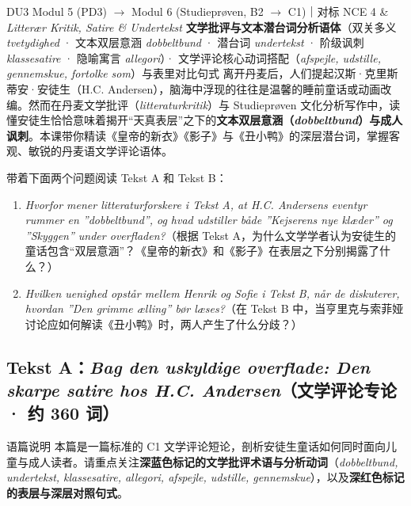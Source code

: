 {DU3 Modul 5 (PD3) $\rightarrow$ Modul 6 (Studieprøven, B2 $\rightarrow$ C1)｜对标 NCE 4 \& \textit{Litterær Kritik, Satire \& Undertekst}}
{\textbf{文学批评与文本潜台词分析语体}（双关多义 \textit{tvetydighed} · 文本双层意涵 \textit{dobbeltbund} · 潜台词 \textit{undertekst} · 阶级讽刺 \textit{klassesatire} · 隐喻寓言 \textit{allegori}）· 文学评论核心动词搭配（\textit{afspejle, udstille, gennemskue, fortolke som}）与表里对比句式}
{离开丹麦后，人们提起汉斯·克里斯蒂安·安徒生（H.C. Andersen），脑海中浮现的往往是温馨的睡前童话或动画改编。然而在丹麦文学批评（\textit{litteraturkritik}）与 Studieprøven 文化分析写作中，读懂安徒生恰恰意味着揭开“天真表层”之下的\textbf{文本双层意涵（\textit{dobbeltbund}）与成人讽刺}。本课带你精读《皇帝的新衣》《影子》与《丑小鸭》的深层潜台词，掌握客观、敏锐的丹麦语文学评论语体。}

\begin{foerduleaeser}
带着下面两个问题阅读 Tekst A 和 Tekst B：
\begin{enumerate}
  \item \textit{Hvorfor mener litteraturforskere i Tekst A, at H.C. Andersens eventyr rummer en ”dobbeltbund”, og hvad udstiller både ”Kejserens nye klæder” og ”Skyggen” under overfladen?}（根据 Tekst A，为什么文学学者认为安徒生的童话包含“双层意涵”？《皇帝的新衣》和《影子》在表层之下分别揭露了什么？）
  \item \textit{Hvilken uenighed opstår mellem Henrik og Sofie i Tekst B, når de diskuterer, hvordan ”Den grimme ælling” bør læses?}（在 Tekst B 中，当亨里克与索菲娅讨论应如何解读《丑小鸭》时，两人产生了什么分歧？）
\end{enumerate}
\end{foerduleaeser}


\subsection*{Tekst A：\textit{Bag den uskyldige overflade: Den skarpe satire hos H.C. Andersen}（文学评论专论 · 约 360 词）}

\begin{tipbox}{语篇说明}
本篇是一篇标准的 C1 文学评论短论，剖析安徒生童话如何同时面向儿童与成人读者。请重点关注\textbf{\color{NCDNavy}深蓝色标记的文学批评术语与分析动词}（\textit{dobbeltbund, undertekst, klassesatire, allegori, afspejle, udstille, gennemskue}），以及\textbf{\color{NCDRed}深红色标记的表层与深层对照句式}。
\end{tipbox}

